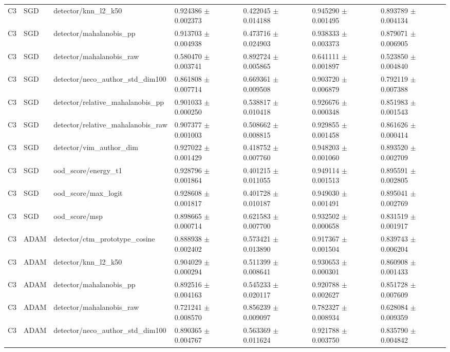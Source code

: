 \begin{longtable}{lllllll}
C3 & SGD & detector/knn\_l2\_k50 & 0.924386 $\pm$ 0.002373 & 0.422045 $\pm$ 0.014188 & 0.945290 $\pm$ 0.001495 & 0.893789 $\pm$ 0.004134 \\
C3 & SGD & detector/mahalanobis\_pp & 0.913703 $\pm$ 0.004938 & 0.473716 $\pm$ 0.024903 & 0.938333 $\pm$ 0.003373 & 0.879071 $\pm$ 0.006905 \\
C3 & SGD & detector/mahalanobis\_raw & 0.580470 $\pm$ 0.003741 & 0.892724 $\pm$ 0.005865 & 0.641111 $\pm$ 0.001897 & 0.523850 $\pm$ 0.004840 \\
C3 & SGD & detector/neco\_author\_std\_dim100 & 0.861808 $\pm$ 0.007714 & 0.669361 $\pm$ 0.009508 & 0.903720 $\pm$ 0.006879 & 0.792119 $\pm$ 0.007388 \\
C3 & SGD & detector/relative\_mahalanobis\_pp & 0.901033 $\pm$ 0.000250 & 0.538817 $\pm$ 0.010418 & 0.926676 $\pm$ 0.000348 & 0.851983 $\pm$ 0.001543 \\
C3 & SGD & detector/relative\_mahalanobis\_raw & 0.907377 $\pm$ 0.001003 & 0.508662 $\pm$ 0.008815 & 0.929855 $\pm$ 0.001458 & 0.861626 $\pm$ 0.000414 \\
C3 & SGD & detector/vim\_author\_dim & 0.927022 $\pm$ 0.001429 & 0.418752 $\pm$ 0.007760 & 0.948203 $\pm$ 0.001060 & 0.893520 $\pm$ 0.002709 \\
C3 & SGD & ood\_score/energy\_t1 & 0.928796 $\pm$ 0.001864 & 0.401215 $\pm$ 0.011055 & 0.949114 $\pm$ 0.001513 & 0.895591 $\pm$ 0.002805 \\
C3 & SGD & ood\_score/max\_logit & 0.928608 $\pm$ 0.001817 & 0.401728 $\pm$ 0.010187 & 0.949030 $\pm$ 0.001491 & 0.895041 $\pm$ 0.002769 \\
C3 & SGD & ood\_score/msp & 0.898665 $\pm$ 0.000714 & 0.621583 $\pm$ 0.007700 & 0.932502 $\pm$ 0.000658 & 0.831519 $\pm$ 0.001917 \\
C3 & ADAM & detector/ctm\_prototype\_cosine & 0.888938 $\pm$ 0.002402 & 0.573421 $\pm$ 0.013890 & 0.917367 $\pm$ 0.001504 & 0.839743 $\pm$ 0.006204 \\
C3 & ADAM & detector/knn\_l2\_k50 & 0.904029 $\pm$ 0.000294 & 0.511399 $\pm$ 0.008641 & 0.930653 $\pm$ 0.000301 & 0.860908 $\pm$ 0.001433 \\
C3 & ADAM & detector/mahalanobis\_pp & 0.892516 $\pm$ 0.004163 & 0.545233 $\pm$ 0.020117 & 0.920788 $\pm$ 0.002627 & 0.851728 $\pm$ 0.007609 \\
C3 & ADAM & detector/mahalanobis\_raw & 0.721241 $\pm$ 0.008570 & 0.856239 $\pm$ 0.009097 & 0.782327 $\pm$ 0.008934 & 0.628084 $\pm$ 0.009359 \\
C3 & ADAM & detector/neco\_author\_std\_dim100 & 0.890365 $\pm$ 0.004767 & 0.563369 $\pm$ 0.011624 & 0.921788 $\pm$ 0.003750 & 0.835790 $\pm$ 0.004842 \\

\end{longtable}
